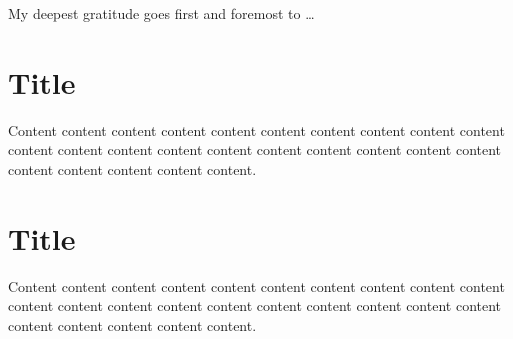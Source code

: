 \documentclass[degree=bachelor,language=english]{thuthesis}
\begin{document}
\begin{acknowledgements}
  My deepest gratitude goes first and foremost to …
\end{acknowledgements}

\statement

\appendix

\chapter{Title}

Content content content content content content content content content content content content content content content content content content content content content content content content content.




\chapter{Title}

Content content content content content content content content content content content content content content content content content content content content content content content content content.




\backmatter

\clearpage
\OMIT
\end{document}
